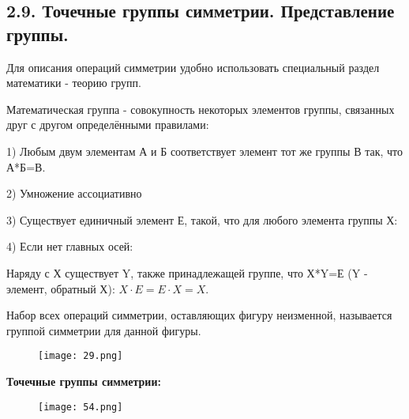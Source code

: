 
\subsection{2.9. Точечные группы симметрии. Представление группы.} 

\par\bigskip

Для описания операций симметрии удобно использовать
специальный раздел математики - теорию групп.

\par\smallskip

Математическая группа - совокупность некоторых элементов
группы, связанных друг с другом определёнными правилами:

\par\smallskip

1) Любым двум элементам А и Б соответствует элемент тот же
группы В так, что А*Б=В.

\par\smallskip

2) Умножение ассоциативно

\par\smallskip

3) Существует единичный элемент Е, такой, что для любого
элемента группы Х:
 
 \par\smallskip
 
4) Если нет главных осей:

 \par\smallskip
 
Наряду с Х существует Y, также принадлежащей группе, что
Х*Y=Е (Y - элемент, обратный Х): $X\cdot E = E\cdot X = X$.

  \par\smallskip
  
Набор всех операций симметрии, оставляющих фигуру
неизменной, называется группой симметрии для данной фигуры.

\begin{figure}[H]
	\centering
	{\texttt{[image: 29.png]}}
\end{figure}


\begin{center}
	\textbf{Точечные группы симметрии:}
\end{center}

\begin{figure}[H]
	\centering
	{\texttt{[image: 54.png]}}
\end{figure}

